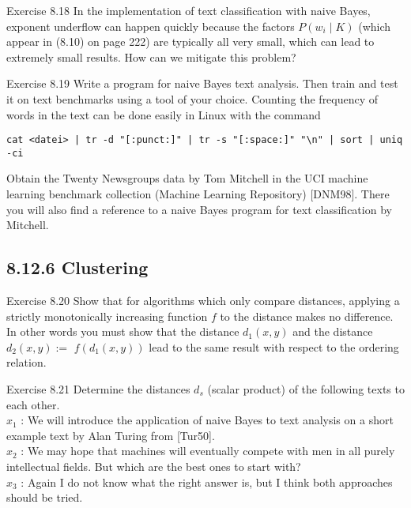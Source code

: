 \documentclass[10pt]{article}
\begin{document}
Exercise 8.18 In the implementation of text classification with naive Bayes, exponent underflow can happen quickly because the factors $P\left(w_{i} \mid K\right)$ (which appear in (8.10) on page 222) are typically all very small, which can lead to extremely small results. How can we mitigate this problem?

Exercise 8.19 Write a program for naive Bayes text analysis. Then train and test it on text benchmarks using a tool of your choice. Counting the frequency of words in the text can be done easily in Linux with the command

\begin{verbatim}
cat <datei> | tr -d "[:punct:]" | tr -s "[:space:]" "\n" | sort | uniq -ci
\end{verbatim}

Obtain the Twenty Newsgroups data by Tom Mitchell in the UCI machine learning benchmark collection (Machine Learning Repository) [DNM98]. There you will also find a reference to a naive Bayes program for text classification by Mitchell.

\subsection*{8.12.6 Clustering}
Exercise 8.20 Show that for algorithms which only compare distances, applying a strictly monotonically increasing function $f$ to the distance makes no difference. In other words you must show that the distance $d_{1}(x, y)$ and the distance $d_{2}(x, y):=$ $f\left(d_{1}(x, y)\right)$ lead to the same result with respect to the ordering relation.

Exercise 8.21 Determine the distances $d_{s}$ (scalar product) of the following texts to each other.\\
$x_{1}$ : We will introduce the application of naive Bayes to text analysis on a short example text by Alan Turing from [Tur50].\\
$x_{2}$ : We may hope that machines will eventually compete with men in all purely intellectual fields. But which are the best ones to start with?\\
$x_{3}$ : Again I do not know what the right answer is, but I think both approaches should be tried.
\end{document}
